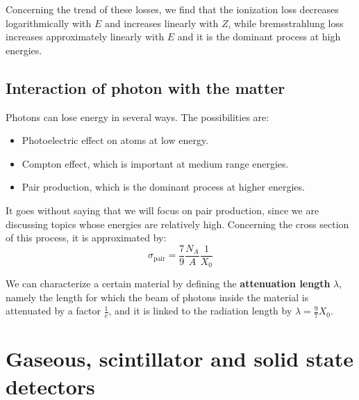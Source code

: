 \documentclass[../../main/main.tex]{subfiles}
\begin{document}
Concerning the trend of these losses, we find that the ionization loss decreases logarithmically with \( E \) and increases linearly with \( Z \), while bremsstrahlung loss increases approximately linearly with \( E \) and it is the dominant process at high energies.



\subsection{Interaction of photon with the matter}
Photons can lose energy in several ways. The possibilities are:
\begin{itemize}
    \item Photoelectric effect on atoms at low energy.
    \item Compton effect, which is important at medium range energies.
    \item Pair production, which is the dominant process at higher energies.
\end{itemize}
It goes without saying that we will focus on pair production, since we are discussing topics whose energies are relatively high. Concerning the cross section of this process, it is approximated by:
\begin{equation}
    \sigma_\mathrm{pair}
    =
    \frac{7}{9} \frac{N_A}{A} \frac{1}{X_0}
    \label{eq:L04_PPCS}
\end{equation}

We can characterize a certain material by defining the \textbf{attenuation length} \( \lambda \), namely the length for which the beam of photons inside the material is attenuated by a factor \( \frac{1}{e} \), and it is linked to the radiation length by \( \lambda = \frac{9}{7} X_0 \).





\section{Gaseous, scintillator and solid state detectors}
\end{document}
